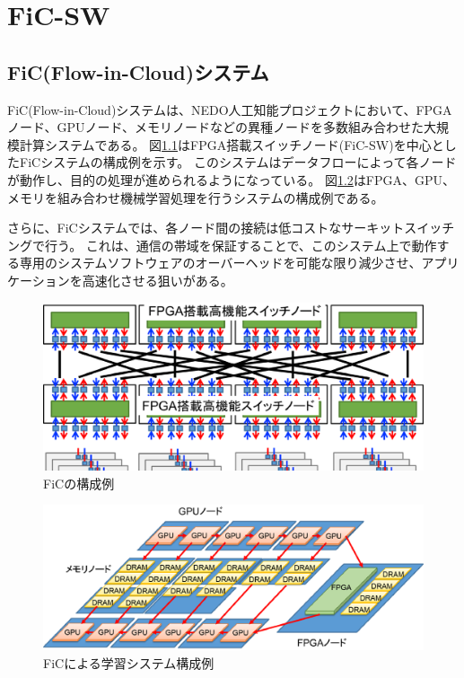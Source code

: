 \chapter{FiC-SW}
\section{FiC(Flow-in-Cloud)システム}
FiC(Flow-in-Cloud)システムは、NEDO人工知能プロジェクトにおいて、FPGAノード、GPUノード、メモリノードなどの異種ノードを多数組み合わせた大規模計算システムである。
図\ref{fig_fic1}はFPGA搭載スイッチノード(FiC-SW)を中心としたFiCシステムの構成例を示す。
このシステムはデータフローによって各ノードが動作し、目的の処理が進められるようになっている。
図\ref{fig_fic2}はFPGA、GPU、メモリを組み合わせ機械学習処理を行うシステムの構成例である。

さらに、FiCシステムでは、各ノード間の接続は低コストなサーキットスイッチングで行う。
これは、通信の帯域を保証することで、このシステム上で動作する専用のシステムソフトウェアのオーバーヘッドを可能な限り減少させ、アプリケーションを高速化させる狙いがある。

\begin{figure}[ht]  
 \begin{center}   
	\includegraphics[width=1.0\columnwidth]{fig/FiC.eps}
  \caption{FiCの構成例}
  \label{fig_fic1}  
 \end{center}  
\end{figure}

\begin{figure}[ht]  
 \begin{center}   
	\includegraphics[width=1.0\columnwidth]{fig/example.eps}
  \caption{FiCによる学習システム構成例}
  \label{fig_fic2}  
 \end{center}  
\end{figure}

